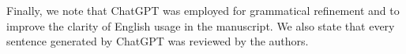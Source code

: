 Finally, we note that ChatGPT was employed for grammatical refinement and to improve the clarity of English usage in the manuscript.
We also state that every sentence generated by ChatGPT was reviewed by the authors.


